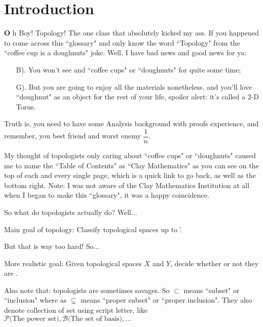 


\maketitle

\thispagestyle{empty}
\section*{Introduction}

\lettrine[findent=2pt]{\textbf{O}}{ }h Boy! Topology! The one class that absolutely kicked my ass. If you happened to come across this ``glossary" and only know the word ``Topology" from the ``coffee cup is a doughnuts" joke. Well, I have bad news and good news for ya:
\begin{enumerate}
    \item[B).] You won't see and ``coffee cups" or ``doughnuts" for quite some time;
    \item[G).] But you are going to enjoy all the materials nonetheless, and you'll love ``doughnut" as an object for the rest of your life, spoiler alert: it's called a $2$-D Torus. 
\end{enumerate}

Truth is, you need to have some Analysis background with proofs experience, and remember, you best friend and worst enemy $\dfrac{1}{n}$.

My thought of topologists only caring about ``coffee cups" or ``doughnuts" caused me to name the ``Table of Contents" as ``Clay Mathematics" as you can see on the top of each and every single page, which is a quick link to go back, as well as the bottom right. Note: I was not aware of the Clay Mathematics Institution at all when I began to make this ``glossary", it was a happy coincidence.

So what do topologists actually do? Well...
\begin{center}
    Main goal of topology: Classify topological spaces up to \h.
\end{center}

But that is way too hard! So...

\begin{center}
    More realistic goal: Given topological spaces $X$ and $Y$, decide whether or not they are \hc.
\end{center}

Also note that: topologists are sometimes savages. So $\subset$ means ``subset" or ``inclusion" where as $	\subsetneq$ means ``proper subset" or ``proper inclusion". They also denote collection of set using script letter, like $\mathcal{P}\text{(The power set)}, \mathcal{B}\text{(The set of basis)}, \dots$

